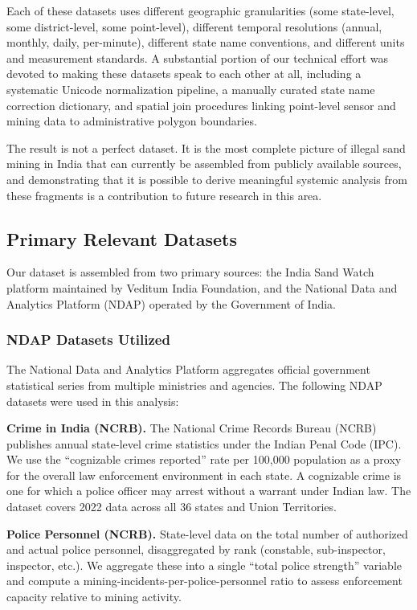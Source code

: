 \documentclass[12pt]{article}
\begin{document}
Each of these datasets uses different geographic granularities (some state-level, some district-level, some point-level), different temporal resolutions (annual, monthly, daily, per-minute), different state name conventions, and different units and measurement standards. A substantial portion of our technical effort was devoted to making these datasets speak to each other at all, including a systematic Unicode normalization pipeline, a manually curated state name correction dictionary, and spatial join procedures linking point-level sensor and mining data to administrative polygon boundaries.

The result is not a perfect dataset. It is the most complete picture of illegal sand mining in India that can currently be assembled from publicly available sources, and demonstrating that it is possible to derive meaningful systemic analysis from these fragments is a contribution to future research in this area.

\subsection{Primary Relevant Datasets}

Our dataset is assembled from two primary sources: the India Sand Watch platform maintained by Veditum India Foundation, and the National Data and Analytics Platform (NDAP) operated by the Government of India.

\subsubsection{NDAP Datasets Utilized}

The National Data and Analytics Platform aggregates official government statistical series from multiple ministries and agencies. The following NDAP datasets were used in this analysis:

\textbf{Crime in India (NCRB).} The National Crime Records Bureau (NCRB) publishes annual state-level crime statistics under the Indian Penal Code (IPC). We use the ``cognizable crimes reported'' rate per 100,000 population as a proxy for the overall law enforcement environment in each state. A cognizable crime is one for which a police officer may arrest without a warrant under Indian law. The dataset covers 2022 data across all 36 states and Union Territories.

\textbf{Police Personnel (NCRB).} State-level data on the total number of authorized and actual police personnel, disaggregated by rank (constable, sub-inspector, inspector, etc.). We aggregate these into a single ``total police strength'' variable and compute a mining-incidents-per-police-personnel ratio to assess enforcement capacity relative to mining activity.
\end{document}
